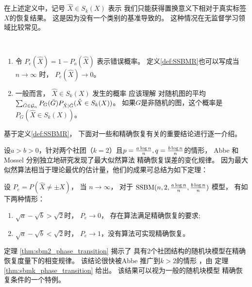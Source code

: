 在上述定义中，记号 $\hat{X} \in S_k(X)$ 表示
我们只能获得置换意义下相对于真实标签$X$的恢复结果。
这是因为没有一个类别的基准导致的。
这种情况在无监督学习领域比较常见。
\begin{remark}\label{rem:metric_exact_recovery}\,
  \begin{enumerate}
    \item 令 $P_e(\hat{X}) = 1 - P_a(\hat{X})$
    表示错误概率。
    定义\ref{def:SSBMR}也可以写成当$n\to \infty$
    时，
    $P_e(\hat{X}) \to 0$。
  \item  %
  一般而言， $\hat{X} \in S_k(X)$ 发生的概率 应该理解
  对随机图的平均 $\sum_{\bar{G} \in \mathcal{G}_n} P_G(\bar{G}) P_{\hat{X}|\bar{G}}(\hat{X} \in S_k(X))$。 
  如果$G$是非随机的图，这个概率是 $P_G(\hat{X} \in S_k(X))$。  
  \end{enumerate}
\end{remark}

基于定义\ref{def:SSBMR}，
下面对一些和精确恢复有关的重要结论进行逐一介绍。

设$a>b>0$，针对两个社团（$k=2$）且$p=\frac{a \log n}{n},q=\frac{b \log n}{n}$的情形，
Abbe \cite{abbe2015exact} 和 Mossel
\cite{mossel2016} 分别独立地研究发现了最大似然算法
精确恢复误差的变化规律。
因为最大似然算法相当于理论最优的估计量，他们的成果可总结为如下定理：
\begin{theorem}\label{thm:sbm2_phase_transition}
设 $P_e=P(\hat{X} \neq \pm X)$， 当 $n \to \infty$，
对于 $\operatorname{SSBM}(n,2,\frac{a \log n}{n}, \frac{b \log n}{n})$ 模型，
有如下两种情形：
	\begin{enumerate}
		\item $\sqrt{a} - \sqrt{b} > \sqrt{2}$时，
    $P_e \to 0$， 存在算法满足精确恢复的要求;
		\item $\sqrt{a} - \sqrt{b} < \sqrt{2}$时，
    $P_e \to 1$，没有算法可实现精确恢复。
	\end{enumerate}
\end{theorem}
定理 \ref{thm:sbm2_phase_transition} 揭示了
具有2个社团结构的随机块模型在精确恢复度量下的相变规律。
该结论很快被Abbe 推广到$k>2$的情形
\cite{abbe2015community}，由
定理 \ref{thm:sbmk_phase_transition} 给出。
该结果可以视为一般的随机块模型
精确恢复条件的一个特例。

